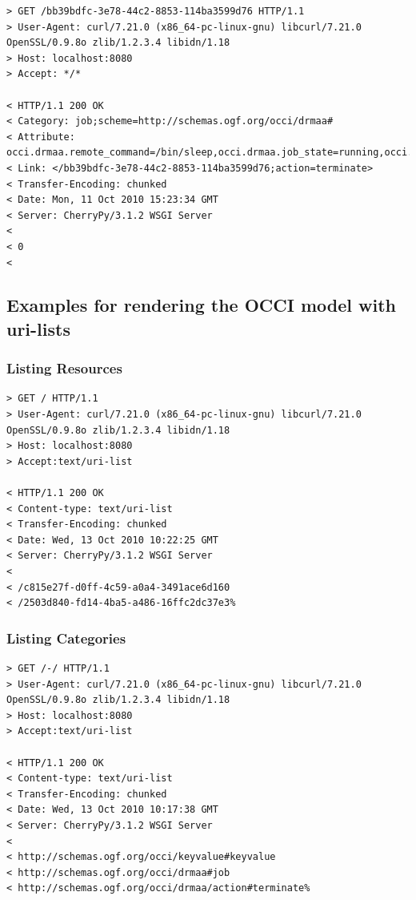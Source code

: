 \documentclass[10pt,a4paper]{article}
\begin{document}
\begin{verbatim}
> GET /bb39bdfc-3e78-44c2-8853-114ba3599d76 HTTP/1.1
> User-Agent: curl/7.21.0 (x86_64-pc-linux-gnu) libcurl/7.21.0 OpenSSL/0.9.8o zlib/1.2.3.4 libidn/1.18
> Host: localhost:8080
> Accept: */*

< HTTP/1.1 200 OK
< Category: job;scheme=http://schemas.ogf.org/occi/drmaa#
< Attribute: occi.drmaa.remote_command=/bin/sleep,occi.drmaa.job_state=running,occi.drmaa.args=100,occi.drmaa.job_id=4657
< Link: </bb39bdfc-3e78-44c2-8853-114ba3599d76;action=terminate>
< Transfer-Encoding: chunked
< Date: Mon, 11 Oct 2010 15:23:34 GMT
< Server: CherryPy/3.1.2 WSGI Server
< 
< 0
<
\end{verbatim}

\subsection{Examples for rendering the OCCI model with uri-lists}

\subsubsection{Listing Resources}

\begin{verbatim}
> GET / HTTP/1.1
> User-Agent: curl/7.21.0 (x86_64-pc-linux-gnu) libcurl/7.21.0 OpenSSL/0.9.8o zlib/1.2.3.4 libidn/1.18
> Host: localhost:8080
> Accept:text/uri-list

< HTTP/1.1 200 OK
< Content-type: text/uri-list
< Transfer-Encoding: chunked
< Date: Wed, 13 Oct 2010 10:22:25 GMT
< Server: CherryPy/3.1.2 WSGI Server
< 
< /c815e27f-d0ff-4c59-a0a4-3491ace6d160
< /2503d840-fd14-4ba5-a486-16ffc2dc37e3%  
\end{verbatim}

\subsubsection{Listing Categories}

\begin{verbatim}
> GET /-/ HTTP/1.1
> User-Agent: curl/7.21.0 (x86_64-pc-linux-gnu) libcurl/7.21.0 OpenSSL/0.9.8o zlib/1.2.3.4 libidn/1.18
> Host: localhost:8080
> Accept:text/uri-list

< HTTP/1.1 200 OK
< Content-type: text/uri-list
< Transfer-Encoding: chunked
< Date: Wed, 13 Oct 2010 10:17:38 GMT
< Server: CherryPy/3.1.2 WSGI Server
< 
< http://schemas.ogf.org/occi/keyvalue#keyvalue
< http://schemas.ogf.org/occi/drmaa#job
< http://schemas.ogf.org/occi/drmaa/action#terminate%    
\end{verbatim}
\end{document}
